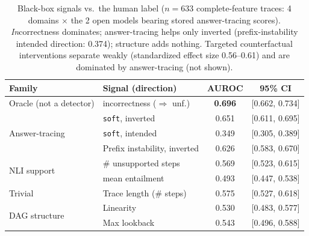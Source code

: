 \documentclass[11pt]{article}
\begin{document}
\begin{table}[t]
\centering
\small
\begin{tabular}{@{}llcc@{}}
\toprule
\textbf{Family} & \textbf{Signal (direction)} & \textbf{AUROC} & \textbf{95\% CI} \\
\midrule
Oracle (not a detector) & incorrectness ($\Rightarrow$ unf.) & \textbf{0.696} & [0.662, 0.734] \\
\midrule
\multirow{3}{*}{Answer-tracing} & \texttt{soft}, inverted & 0.651 & [0.611, 0.695] \\
 & \texttt{soft}, intended & 0.349 & [0.305, 0.389] \\
 & Prefix instability, inverted & 0.626 & [0.583, 0.670] \\
\midrule
\multirow{2}{*}{NLI support} & \# unsupported steps & 0.569 & [0.523, 0.615] \\
 & mean entailment & 0.493 & [0.447, 0.538] \\
\midrule
Trivial & Trace length (\# steps) & 0.575 & [0.527, 0.618] \\
\midrule
\multirow{2}{*}{DAG structure} & Linearity & 0.530 & [0.483, 0.577] \\
 & Max lookback & 0.543 & [0.496, 0.588] \\
\bottomrule
\end{tabular}
\caption{Black-box signals vs.\ the human label ($n{=}633$ complete-feature traces: 4 domains $\times$ the 2 open models bearing stored answer-tracing scores). \emph{In}correctness dominates; answer-tracing helps only inverted (prefix-instability intended direction: 0.374); structure adds nothing. Targeted counterfactual interventions separate weakly (standardized effect size 0.56--0.61) and are dominated by answer-tracing (not shown).}
\label{tab:audit}
\end{table}
\end{document}
